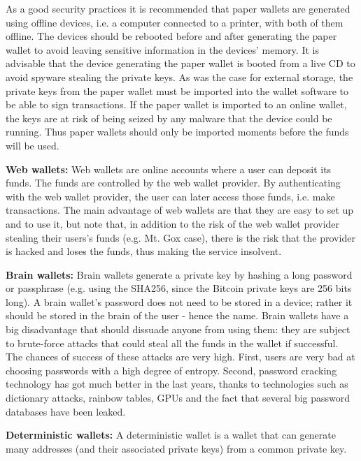 \documentclass{article}
\begin{document}
As a good security practices it is recommended that paper wallets are generated using offline devices, i.e. a computer connected to a printer, with both of them offline. The devices should be rebooted before and after generating the paper wallet to avoid leaving sensitive information in the devices’ memory. It is advisable that the device generating the paper wallet is booted from a live CD to avoid spyware stealing the private keys.\newline
As was the case for external storage, the private keys from the paper wallet must be imported into the wallet software to be able to sign transactions. If the paper wallet is imported to an online wallet, the keys are at risk of being seized by any malware that the device could be running. Thus paper wallets should only be imported moments before the funds will be used.\par\noindent
\textbf{Web wallets:} Web wallets are online accounts where a user can deposit its funds. The funds are controlled by the web wallet provider. By authenticating with the web wallet provider, the user can later access those funds, i.e. make transactions. The main advantage of web wallets are that they are easy to set up and to use it, but note that, in addition to the risk of the web wallet provider stealing their users’s funds (e.g. Mt. Gox case), there is the risk that the provider is hacked and loses the funds, thus making the service insolvent.\par\noindent
\textbf{Brain wallets:} Brain wallets generate a private key by hashing a long password or passphrase (e.g. using the SHA256, since the Bitcoin private keys are 256 bits long). A brain wallet’s password does not need to be stored in a device; rather it should be stored in the brain of the user - hence the name. Brain wallets have a big disadvantage that should dissuade anyone from using them: they are subject to brute-force attacks that could steal all the funds in the wallet if successful. The chances of success of these attacks are very high. First, users are very bad at choosing passwords with a high degree of entropy. Second, password cracking technology has got much better in the last years, thanks to technologies such as dictionary attacks, rainbow tables, GPUs and the fact that several big password databases have been leaked.\par\noindent
\textbf{Deterministic wallets:} A deterministic wallet is a wallet that can generate many addresses (and their associated private keys) from a common private key.
\end{document}
